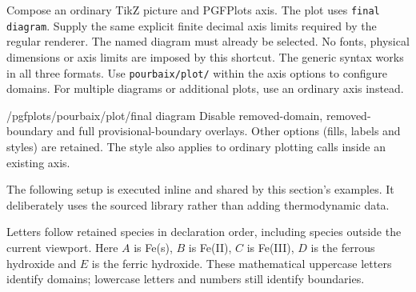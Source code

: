 \documentclass[a4paper,11pt]{ltxdoc}
\begin{document}
\begin{command}{\pgfplotspourbaix{}}
Compose an ordinary TikZ picture and PGFPlots axis.
The plot uses \texttt{final diagram}. Supply the same explicit
finite decimal axis limits required by the regular renderer. The named diagram
must already be selected. No fonts, physical dimensions or axis limits are imposed
by this shortcut. The generic syntax works in all three formats. Use
\texttt{pourbaix/plot/} within the axis options to configure domains.
For multiple diagrams or additional plots, use an ordinary axis instead.
\end{command}
\begin{stylekey}{/pgfplots/pourbaix/plot/final diagram}
Disable removed-domain, removed-boundary and full provisional-boundary overlays.
Other options (fills, labels and styles) are retained. The style also applies to
ordinary plotting calls inside an existing axis.
\end{stylekey}

The following setup is executed inline and shared by this section's examples.
It deliberately uses the sourced library rather than adding thermodynamic data.
\begin{codeexample}
\end{codeexample}

\begin{codeexample}[width=8cm]
\end{codeexample}
Letters follow retained species in declaration order, including species outside
the current viewport. Here $A$ is Fe(s), $B$ is Fe(II), $C$ is Fe(III), $D$ is the
ferrous hydroxide and $E$ is the ferric hydroxide. These mathematical uppercase
letters identify domains; lowercase letters and numbers still identify boundaries.
\end{document}
